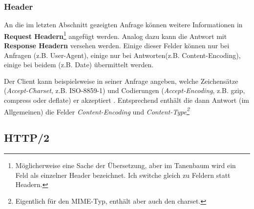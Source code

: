 \documentclass{article} %
\begin{document}
\subsubsection{Header}

An die im letzten Abschnitt gezeigten Anfrage können weitere Informationen in \textbf{Request Headern}\footnote{Möglicherweise eine Sache der Übersetzung, aber im Tanenbaum wird ein Feld als einzelner Header bezeichnet. Ich switche gleich zu Feldern statt Headern.} angefügt werden.
Analog dazu kann die Antwort mit \textbf{Response Headern} versehen werden.
Einige dieser Felder können nur bei Anfragen (z.B. User-Agent), einige nur bei Antworten(z.B. Content-Encoding), einige bei beidem (z.B. Date) übermittelt werden.

Der Client kann beispielsweise in seiner Anfrage angeben, welche Zeichensätze (\emph{Accept-Charset}, z.B. ISO-8859-1) und Codierungen (\emph{Accept-Encoding}, z.B. gzip, compress oder deflate\cite{rfc1950,rfc1951}) er akzeptiert .
Entsprechend enthält die dann Antwort (im Allgemeinen) die Felder \emph{Content-Encoding} und \emph{Content-Type\footnote{Eigentlich für den MIME-Typ, enthält aber auch den charset.}}





\subsection{HTTP/2}
\end{document}
